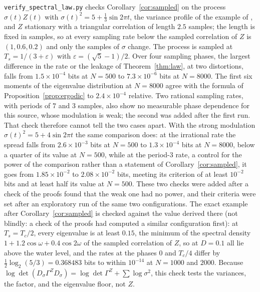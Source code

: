 \documentclass[11pt,onecolumn]{IEEEtran}
\begin{document}
\texttt{verify\_spectral\_law.py} checks Corollary~\ref{cor:sampled} on
the process $\sigma(t)Z(t)$ with $\sigma(t)^2=5+\tfrac13\sin2\pi t$, the
variance profile of the example of \cite{tan2024}, and $Z$ stationary
with a triangular correlation of length $2.5$ samples; the length is
fixed in samples, so at every sampling rate below the sampled
correlation of $Z$ is $(1,0.6,0.2)$ and only the samples of $\sigma$
change. The process is sampled at
$T_s=1/(3+\varepsilon)$ with $\varepsilon=(\sqrt5-1)/2$. Over four sampling
phases, the largest difference in the rate or the leakage of
Theorem~\ref{thm:law}, at two distortions, falls from
$1.5\times10^{-4}$ bits at $N=500$ to $7.3\times10^{-6}$ bits at $N=8000$.
The first six moments of the eigenvalue distribution at $N=8000$ agree
with the formula of Proposition~\ref{prop:ergodic} to
$2.4\times10^{-4}$ relative. Two rational sampling rates, with periods of
$7$ and $3$ samples, also show no measurable phase dependence for this
source, whose modulation is weak; the second was added after the first
run. That check therefore cannot tell the two cases apart. With the
strong modulation $\sigma(t)^2=5+4\sin2\pi t$ the same comparison does:
at the irrational rate the spread falls from $2.6\times10^{-3}$ bits at
$N=500$ to $1.3\times10^{-4}$ bits at $N=8000$, below a quarter of its
value at $N=500$, while at the period-$3$ rate, a control for the
power of the comparison rather than a statement of
Corollary~\ref{cor:sampled}, it goes from $1.85\times10^{-2}$ to
$2.08\times10^{-2}$ bits, meeting its criterion of at least $10^{-2}$
bits and at least half its value at $N=500$. These two checks were
added after a check of the proofs found that the weak one had no
power, and their criteria were set after an exploratory run of the
same two configurations. The exact example after
Corollary~\ref{cor:sampled} is checked against the value derived there
(not blindly: a check of the proofs had computed a similar configuration
first): at
$T_s=T_c/2$, every eigenvalue is at least $0.15$, the minimum of the
spectral density $1+1.2\cos\omega+0.4\cos2\omega$ of the sampled
correlation of $Z$, so at $D=0.1$ all lie above the water level, and the
rates at the phases $0$ and $T_c/4$ differ by
$\tfrac12\log_2(5/3)=0.368483$ bits to within $10^{-14}$ at $N=1000$ and
$2000$. Because $\log\det(D_\sigma\Gamma^ZD_\sigma)=\log\det\Gamma^Z+\sum\log\sigma^2$,
this check tests the variances, the factor, and the eigenvalue floor,
not $Z$.
\end{document}
